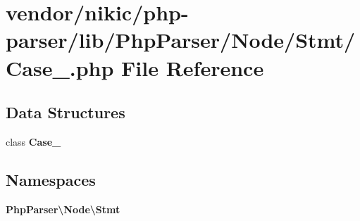 \section{vendor/nikic/php-\/parser/lib/\+Php\+Parser/\+Node/\+Stmt/\+Case\+\_\+.php File Reference}
\label{_case___8php}
\subsection*{Data Structures}
\begin{DoxyCompactItemize}
\item 
class {\bf Case\+\_\+}
\end{DoxyCompactItemize}
\subsection*{Namespaces}
\begin{DoxyCompactItemize}
\item 
 {\bf Php\+Parser\textbackslash{}\+Node\textbackslash{}\+Stmt}
\end{DoxyCompactItemize}
